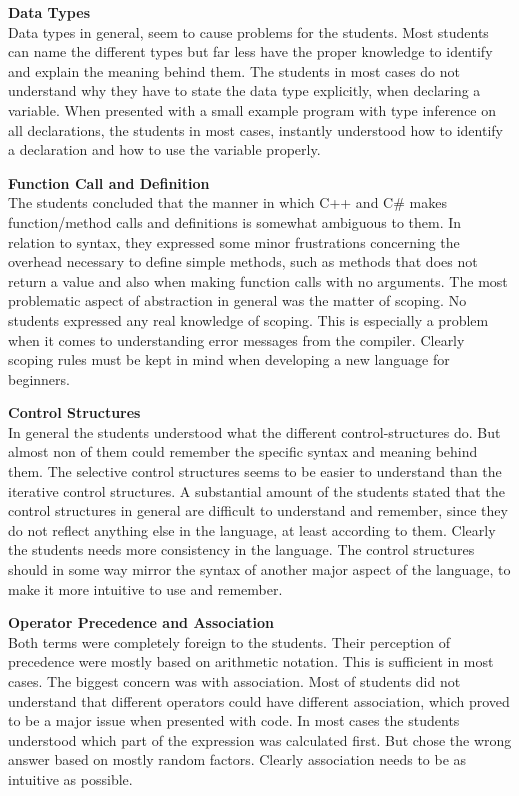 \textbf{Data Types}\\
Data types in general, seem to cause problems for the students. 
Most students can name the different types but far less have the proper knowledge to identify and explain the meaning behind them. 
The students in most cases do not understand why they have to state the data type explicitly, when declaring a variable. 
When presented with a small example program with type inference on all declarations, the students in most cases, instantly understood how to identify a declaration and how to use the variable properly.

\textbf{Function Call and Definition}\\
The students concluded that the manner in which C++ and C{\#} makes function/method calls and definitions is somewhat ambiguous to them. 
In relation to syntax, they expressed some minor frustrations concerning the overhead necessary to define simple methods, such as methods that does not return a value and also when making function calls with no arguments. 
The most problematic aspect of abstraction in general was the matter of scoping. 
No students expressed any real knowledge of scoping. 
This is especially a problem when it comes to understanding error messages from the compiler. 
Clearly scoping rules must be kept in mind when developing a new language for beginners.

\textbf{Control Structures}\\
In general the students understood what the different control-structures do. 
But almost non of them could remember the specific syntax and meaning behind them. 
The selective control structures seems to be easier to understand than the iterative control structures. 
A substantial amount of the students stated that the control structures in general are difficult to understand and remember, since they do not reflect anything else in the language, at least according to them.
Clearly the students needs more consistency in the language. 
The control structures should in some way mirror the syntax of another major aspect of the language, to make it more intuitive to use and remember.

\textbf{Operator Precedence and Association}\\
Both terms were completely foreign to the students. 
Their perception of precedence were mostly based on arithmetic notation. 
This is sufficient in most cases. 
The biggest concern was with association. 
Most of students did not understand that different operators could have different association, which proved to be a major issue when presented with code. 
In most cases the students understood which part of the expression was calculated first. 
But chose the wrong answer based on mostly random factors. 
Clearly association needs to be as intuitive as possible.

